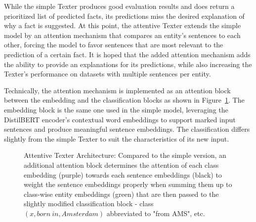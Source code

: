 While the simple Texter produces good evaluation results and does return a prioritized list of predicted facts, its predictions miss the desired explanation of why a fact is suggested. At this point, the attentive Texter extends the simple model by an attention mechanism that compares an entity's sentences to each other, forcing the model to favor sentences that are most relevant to the prediction of a certain fact. It is hoped that the added attention mechanism adds the ability to provide an explanations for its predictions, while also increasing the Texter's performance on datasets with multiple sentences per entity.

Technically, the attention mechanism is implemented as an attention block between the embedding and the classification blocks as shown in Figure~\ref{fig:4_approach/1_texter/3_attention_model/attention_architecture}. The embedding block is the same one used in the simple model, leveraging the DistilBERT encoder's contextual word embeddings to support marked input sentences and produce meaningful sentence embeddings. The classification differs slightly from the simple Texter to suit the characteristics of its new input.

\begin{figure}[t]
    \caption{Attentive Texter Architecture: Compared to the simple version, an additional attention block determines the attention of each class embedding (purple) towards each sentence embeddings (black) to weight the sentence embeddings properly when summing them up to class-wise entity embeddings (green) that are then passed to the slightly modified classification block - class $(x, born~in, Amsterdam)$ abbreviated to "from AMS", etc.}
    \label{fig:4_approach/1_texter/3_attention_model/attention_architecture}
\end{figure}

